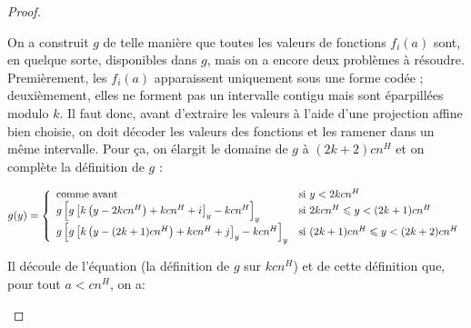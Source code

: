 \documentclass{article}
\begin{document}
\begin{proof}
\begin{enumerate}[itemsep=-1mm,leftmargin=2cm]
					
					On a construit $g$ de telle manière que toutes les valeurs de fonctions $f_i(a)$ sont, en quelque sorte, disponibles dans $g$, mais on a encore deux problèmes à résoudre. Premièrement, les $f_i(a)$ apparaissent uniquement sous une forme codée ; deuxièmement, elles ne forment pas un intervalle contigu mais sont éparpillées modulo $k$. Il faut donc, avant d'extraire les valeurs à l'aide d'une projection affine bien choisie, on doit décoder les valeurs des fonctions et les ramener dans un même intervalle. Pour ça, on élargit le domaine de $g$ à $(2k+2)cn^H$ et on complète la définition de $g$ :
					
					\[
						g(y) = \left\lbrace \begin{array}{ll} 
							\text{comme avant} & \text{si $y < 2kcn^H$} \\
							g\left[ g\left[ k\left( y - 2kcn^H \right) + kcn^H  + i\right]_y - kcn^H  \right]_y & \text{si $2kcn^H \leqslant y < (2k+1)cn^H$} \\
							g\left[ g\left[ k\left( y - (2k + 1)cn^H \right) + kcn^H  + j \right]_y - kcn^H  \right]_y & \text{si $(2k+1)cn^H \leqslant y < (2k+2)cn^H$} \\
							 \end{array} \right.
					\]
					
					Il découle de l'équation \redtext{$(\star)$} (la définition de $g$ sur $kcn^H$) et de cette définition que, pour tout $a < cn^H$, on a\footnotemark :
					
					

\end{enumerate}
\end{proof}
\end{document}

